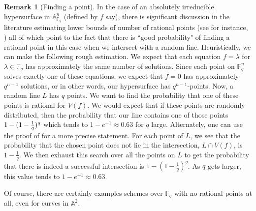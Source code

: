 \documentclass[11pt]{amsart}
\theoremstyle{definition}
\newtheorem{remark}{Remark}[subsection]
\newcommand{\bA}{\mathbb{A}}
\newcommand{\bF}{\mathbb{F}}
\begin{document}
\begin{remark}[Finding a point]
	In the case of an absolutely irreducible hypersurface in $\bA^n_{\bF_q}$ (defined by $f$ say), there is significant discussion in the literature estimating lower bounds of number of rational points (see for instance, \cite{RationalKPointsSource,lang1954number,ghorpade2002number,cafure2006improved}) all of which point to the fact that there is ``good probability" of finding a rational point in this case when we intersect with a random line. Heuristically, we can make the following rough estimation.  We expect that each equation $f = \lambda$ for $\lambda \in \bF_q$ has approximately the same number of solutions.  Since each point on $\bF_q^n$ solves exactly one of these equations, we expect that $f = 0$ has approximately $q^{n-1}$ solutions, or in other words, our hypersurface has $q^{n-1}$-points.  
       Now, a random line $L$ has $q$ points. We want to find the probability that one of these points is  rational for $V(f)$.  We would expect that if these points are randomly distributed, then the probability that our line contains one of those points $1-(1-{1 \over q})^q$ which tends to $1-e^{-1} \approx 0.63$ for $q$ large.   Alternately, one can use the proof of \cite[Proposition 2.12]{bothmer2005quick} for a more precise statement.  For each point of $L$, we see that the probability that  the chosen point does not lie in the intersection, $L\cap V(f)$, is $1-\frac{1}{q}$. We then exhaust this search over all the points on $L$ to get the probability that there is indeed a successful intersection is $1-(1-\frac{1}{q})^{q}$. As $q$ gets larger, this value tends to $1-e^{-1}\approx 0.63$.

       Of course, there are certainly examples schemes over $\bF_q$ with no rational points at all, even for curves in $\bA^2$.
\end{remark}
\end{document}
